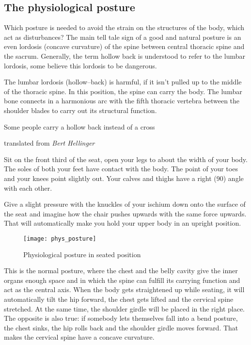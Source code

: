 \documentclass[../main.tex]{subfiles}
\begin{document}
\subsection{The physiological posture}

Which posture is needed to avoid the strain on the structures of the body, which act as disturbances?
The main tell tale sign of a good and natural posture is an {even lordosis} (concave curvature) of the spine between central thoracic spine and the sacrum.
Generally, the term hollow back is understood to refer to the lumbar lordosis, some believe this lordosis to be dangerous.

The lumbar lordosis (hollow--back) is harmful, if it isn't {pulled up to the middle of the thoracic spine}.
In this position, the spine can carry the body.
The lumbar bone connects in a harmonious arc with the fifth thoracic vertebra between the shoulder blades to carry out its structural function.

\epigraph{Some people carry a hollow back instead of a cross}{translated from \textit{Bert Hellinger}}

Sit on the {front third of the seat}, {open your legs} to about the width of your body. \label{Posture:Sitting}
The soles of both your feet have {contact with the body}.
The point of your toes and your knees point slightly out. 
Your {calves and thighs} have a {right (90\degree) angle} with each other. 

Give a slight {pressure} with the knuckles of your ischium {down} onto the surface of the seat and imagine how the {chair pushes upwards} with the same force upwards.
That will automatically make you hold your upper body in an upright position.

        \begin{figure}[htb!]
          \centering
          \texttt{[image: phys\_posture]}
           \caption{Physiological posture in seated position~\cite{Haltung}}
        \end{figure}

This is the {normal posture}, where the chest and the belly cavity give the inner {organs enough space} and in which the {spine} can fulfill its carrying function and act as the {central axis}. 
When the body gets straightened up while seating, it will automatically {tilt the hip forward}, the {chest gets lifted} and the {cervical spine stretched}.
At the same time, the shoulder girdle will be placed in the right place.
The opposite is also true: if somebody lets themselves fall into a {bend posture}, the {chest sinks}, the {hip rolls back} and the {shoulder girdle moves forward}. That makes the {cervical spine} have a {concave curvature}.
\end{document}
